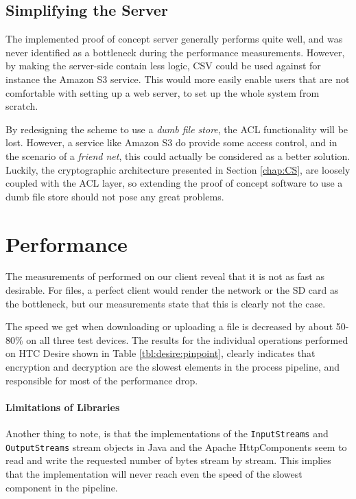 \documentclass[pdftex,english,10pt,b5paper,twoside]{book}
\begin{document}
\subsection{Simplifying the Server}

The implemented proof of concept server generally performs quite well, and was
never identified as a bottleneck during the performance measurements. However,
by making the server-side contain less logic, \ac{CSV} could be used against
for instance the Amazon S3 service. This would more easily enable users that
are not comfortable with setting up a web server, to set up the whole system
from scratch.

By redesigning the scheme to use a \emph{dumb file store}, the \ac{ACL}
functionality will be lost. However, a service like Amazon S3 do provide some
access control, and in the scenario of a \emph{friend net}, this could actually
be considered as a better solution. Luckily, the cryptographic architecture
presented in Section \ref{chap:CS}, are loosely coupled with the \ac{ACL}
layer, so extending the proof of concept software to use a dumb file store
should not pose any great problems.

\section{Performance}

The measurements of performed on our client reveal that it is not as fast as
desirable. For files, a perfect client would render the network or the SD card
as the bottleneck, but our measurements state that this is clearly not the
case. 

The speed we get when downloading or uploading a file is decreased by about
50-80\% on all three test devices. The results for the individual operations
performed on HTC Desire shown in Table \ref{tbl:desire:pinpoint}, clearly
indicates that encryption and decryption are the slowest elements in the
process pipeline, and responsible for most of the performance drop. 

\paragraph{Limitations of Libraries} Another thing to note, is that the
implementations of the \texttt{InputStreams} and \texttt{OutputStreams} stream
objects in Java and the Apache HttpComponents seem to read and write the
requested number of bytes stream by stream. This implies that the
implementation will never reach even the speed of the slowest component in the
pipeline.
\end{document}
